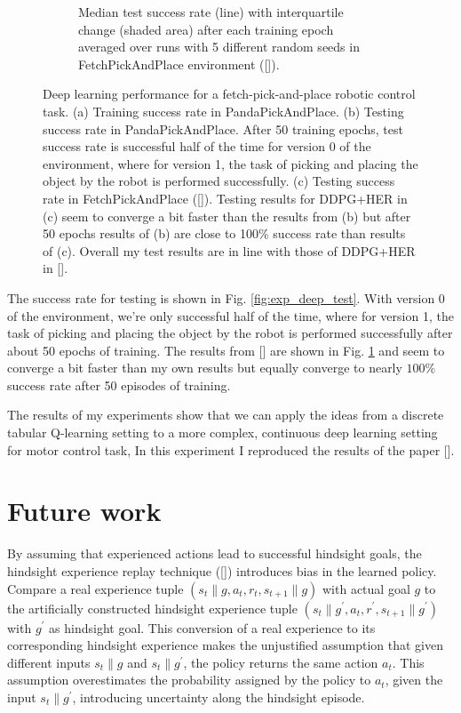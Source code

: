 \documentclass[conference]{IEEEtran}
\begin{document}
\begin{figure}[ht]
\begin{subfigure}[t]{0.30\textwidth}
\caption{Median test success rate (line) with interquartile change (shaded area) after each training epoch averaged over runs with 5 different random seeds in FetchPickAndPlace environment ([\cite{plappert2018multi}]).}
\label{fig:exp_deep_test_plappert}
\end{subfigure}
\caption{Deep learning performance for a fetch-pick-and-place robotic control task. (a) Training success rate in PandaPickAndPlace. (b) Testing success rate in PandaPickAndPlace. After 50 training epochs, test success rate is successful half of the time for version 0 of the environment, where for version 1, the task of picking and placing the object by the robot is performed successfully. (c) Testing success rate in FetchPickAndPlace ([\cite{plappert2018multi}]). Testing results for DDPG+HER in (c) seem to converge a bit faster than the results from (b) but after 50 epochs results of (b) are close to 100\% success rate than results of (c). Overall my test results are in line with those of DDPG+HER in [\cite{plappert2018multi}].}
\label{fig:exp_deep_perf}
\end{figure}

The success rate for testing is shown in Fig. \ref{fig:exp_deep_test}. With version 0 of the environment, we're only successful half of the time, where for version 1, the task of picking and placing the object by the robot is performed successfully after about 50 epochs of training. The results from [\cite{plappert2018multi}] are shown in Fig. \ref{fig:exp_deep_test_plappert} and seem to converge a bit faster than my own results but equally converge to nearly $100\%$ success rate after 50 episodes of training.

The results of my experiments show that we can apply the ideas from a discrete tabular Q-learning setting to a more complex, continuous deep learning setting for motor control task, In this experiment I reproduced the results of the paper [\cite{plappert2018multi}]. 

\section{Future work} \label{sec:future_work}
By assuming that experienced actions lead to successful hindsight goals, the hindsight experience replay technique ([\cite{andrychowicz2017hindsight}]) introduces bias in the learned policy. Compare a real experience tuple $(s_t\|g, a_t, r_t, s_{t+1}\|g)$ with actual goal $g$ to the artificially constructed hindsight experience tuple $(s_t\|g^{\prime}, a_t, r^{\prime}, s_{t+1}\|g^{\prime})$ with $g^{\prime}$ as hindsight goal. This conversion of a real experience to its corresponding hindsight experience makes the unjustified assumption that given different
inputs $s_t\|g$ and $s_t\|g^{\prime}$, the policy returns the same action $a_t$. This assumption overestimates the probability assigned by the policy to $a_t$, given the input $s_t\|g^{\prime}$, introducing uncertainty along the hindsight episode.
\end{document}
